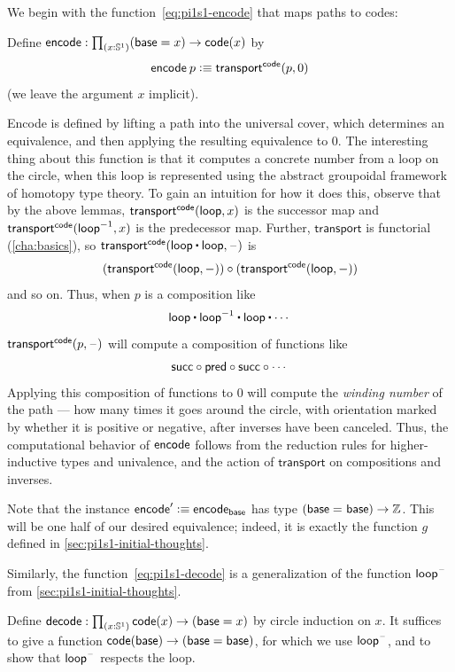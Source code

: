 %
%
%
We begin with the function~\eqref{eq:pi1s1-encode} that maps paths to codes:
\begin{defn}
Define $\encode : \prd{x : \Sn ^1} (\base=x) \rightarrow  \code(x)$ by
\[
\mathsf{encode} \: p \vcentcolon\equiv \mathsf{transport}^{\mathsf{code}}(p,0)
\]
(we leave the argument $x$ implicit).
\end{defn}
Encode is defined by lifting a path into the universal cover, which
determines an equivalence, and then applying the resulting equivalence
to $0$.
The interesting thing about this function is that it computes a concrete
number from a loop on the circle, when this loop is represented using
the abstract groupoidal framework of homotopy type theory.  To gain an
intuition for how it does this, observe that by the above lemmas,
$\mathsf{transport}^{\mathsf{code}}(\mathsf{loop},x)$ is the successor map and $\mathsf{transport}^{\mathsf{code}}(\mathord{{\mathsf{loop}}^{-1}},x)$ is the predecessor map.
Further, $\mathsf{transport}$ is functorial (\cref{cha:basics}), so
$\transfib{\code} {\lloop \ct \lloop}{\blank}$ is
\[(\mathsf{transport}^{\mathsf{code}}(\mathsf{loop},-)) \circ (\mathsf{transport}^{\mathsf{code}}(\mathsf{loop},-))\]
and so on.
Thus, when $p$ is a composition like
\[
\lloop \ct \opp \lloop \ct \lloop \ct \cdots
\]
$\mathsf{transport}^{\mathsf{code}}(p,\mathord{\hspace{1pt}\text{--}\hspace{1pt}})$ will compute a composition of functions like
\[
\mathsf{succ} \circ \mathsf{pred} \circ \mathsf{succ} \circ \cdots
\]
Applying this composition of functions to 0 will compute the
%
\emph{winding number} of the path --- how many times it goes around the
circle, with orientation marked by whether it is positive or negative,
after inverses have been canceled.  Thus, the computational behavior of
$\mathsf{encode}$ follows from the reduction rules for higher-inductive types and
univalence, and the action of $\mathsf{transport}$ on compositions and inverses.

Note that the instance $\mathsf{encode}' \vcentcolon\equiv \mathsf{encode}_{\mathsf{base}}$ has type
$(\mathsf{base} =_{} \mathsf{base}) \rightarrow \mathbb{Z}$.
This will be one half of our desired equivalence; indeed, it is exactly the function $g$ defined in \cref{sec:pi1s1-initial-thoughts}.

Similarly, the function~\eqref{eq:pi1s1-decode} is a generalization of the function $\mathsf{loop}^{\mathord{\hspace{1pt}\text{--}\hspace{1pt}}}$ from \cref{sec:pi1s1-initial-thoughts}.

\begin{defn}\label{thm:pi1s1-decode}
Define $\decode : \prd{x : \Sn ^1}\code(x) \rightarrow (\base=x)$ by
circle induction on $x$.  It suffices to give a function
${\mathsf{code}(\mathsf{base}) \rightarrow (\mathsf{base}=\mathsf{base})}$, for which we use $\mathsf{loop}^{\mathord{\hspace{1pt}\text{--}\hspace{1pt}}}$, and
to show that $\mathsf{loop}^{\mathord{\hspace{1pt}\text{--}\hspace{1pt}}}$ respects the loop.
\end{defn}

